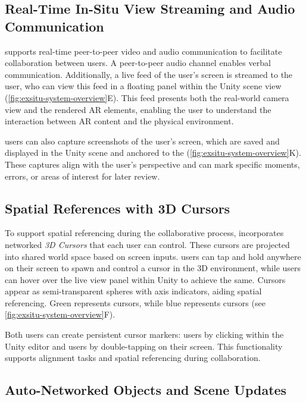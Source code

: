 \subsection{Real-Time In-Situ View Streaming and Audio Communication}

\SystemName supports real-time peer-to-peer video and audio communication to facilitate collaboration between users. A peer-to-peer audio channel enables verbal communication. Additionally, a live feed of the \insitu user's screen is streamed to the \exsitu user, who can view this feed in a floating panel within the Unity scene view (\cref{fig:exsitu-system-overview}E). This feed presents both the real-world camera view and the rendered AR elements, enabling the \exsitu user to understand the interaction between AR content and the physical environment.

\Exsitu users can also capture screenshots of the \insitu user's screen, which are saved and displayed in the Unity scene and anchored to the \locMesh (\cref{fig:exsitu-system-overview}K). These captures align with the \insitu user's perspective and can mark specific moments, errors, or areas of interest for later review.

\subsection{Spatial References with 3D Cursors}

To support spatial referencing during the collaborative process, \SystemName incorporates networked \textit{3D Cursors} that each user can control. These cursors are projected into shared world space based on screen inputs. \Insitu users can tap and hold anywhere on their screen to spawn and control a cursor in the 3D environment, while \exsitu users can hover over the live \insitu view panel within Unity to achieve the same. Cursors appear as semi-transparent spheres with axis indicators, aiding spatial referencing. Green represents \insitu cursors, while blue represents \exsitu cursors (see \cref{fig:exsitu-system-overview}F).

Both users can create persistent cursor markers: \exsitu users by clicking within the Unity editor and \insitu users by double-tapping on their screen. This functionality supports alignment tasks and spatial referencing during collaboration.

\subsection{Auto-Networked Objects and Scene Updates}

